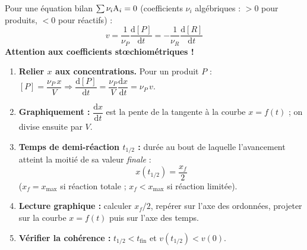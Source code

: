 \documentclass[11pt]{article}
\begin{document}
\begin{propriete}
Pour une équation bilan $\sum \nu_i \ce{A_i} = 0$ (coefficients $\nu_i$ algébriques : $>0$ pour produits, $<0$ pour réactifs) :
\[ v = \frac{1}{\nu_P}\frac{\mathrm{d}[P]}{\mathrm{d}t} = -\frac{1}{\nu_R}\frac{\mathrm{d}[R]}{\mathrm{d}t} \]
\textbf{Attention aux coefficients stœchiométriques !}
\end{propriete}

\begin{methode}[Exploiter $v = \frac{1}{V}\frac{\mathrm{d}x}{\mathrm{d}t}$ et déterminer $t_{1/2}$]
\begin{enumerate}
\item \textbf{Relier $x$ aux concentrations.} Pour un produit $P$ : $[P] = \dfrac{\nu_P\, x}{V} \Rightarrow \dfrac{\mathrm{d}[P]}{\mathrm{d}t} = \dfrac{\nu_P}{V}\dfrac{\mathrm{d}x}{\mathrm{d}t} = \nu_P\, v$.
\item \textbf{Graphiquement :} $\dfrac{\mathrm{d}x}{\mathrm{d}t}$ est la pente de la tangente à la courbe $x=f(t)$ ; on divise ensuite par $V$.
\item \textbf{Temps de demi-réaction $t_{1/2}$ :} durée au bout de laquelle l'avancement atteint la moitié de sa valeur \emph{finale} :
      \[ x(t_{1/2}) = \frac{x_{f}}{2} \]
      ($x_f = x_{\max}$ si réaction totale ; $x_f < x_{\max}$ si réaction limitée).
\item \textbf{Lecture graphique :} calculer $x_f/2$, repérer sur l'axe des ordonnées, projeter sur la courbe $x=f(t)$ puis sur l'axe des temps.
\item \textbf{Vérifier la cohérence :} $t_{1/2} < t_{\text{fin}}$ et $v(t_{1/2}) < v(0)$.
\end{enumerate}
\end{methode}
\end{document}
